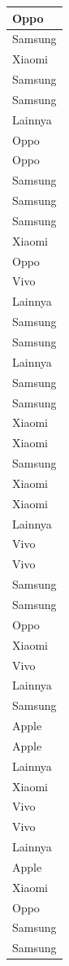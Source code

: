 \documentclass[
  letterpaper,
  DIV=11,
  numbers=noendperiod]{scrartcl}
\begin{document}
\begin{table}
\begin{tabular}[t]{l}
\hline
Oppo\\
\hline
Samsung\\
\hline
Xiaomi\\
\hline
Samsung\\
\hline
Samsung\\
\hline
Lainnya\\
\hline
Oppo\\
\hline
Oppo\\
\hline
Samsung\\
\hline
Samsung\\
\hline
Samsung\\
\hline
Xiaomi\\
\hline
Oppo\\
\hline
Vivo\\
\hline
Lainnya\\
\hline
Samsung\\
\hline
Samsung\\
\hline
Lainnya\\
\hline
Samsung\\
\hline
Samsung\\
\hline
Xiaomi\\
\hline
Xiaomi\\
\hline
Samsung\\
\hline
Xiaomi\\
\hline
Xiaomi\\
\hline
Lainnya\\
\hline
Vivo\\
\hline
Vivo\\
\hline
Samsung\\
\hline
Samsung\\
\hline
Oppo\\
\hline
Xiaomi\\
\hline
Vivo\\
\hline
Lainnya\\
\hline
Samsung\\
\hline
Apple\\
\hline
Apple\\
\hline
Lainnya\\
\hline
Xiaomi\\
\hline
Vivo\\
\hline
Vivo\\
\hline
Lainnya\\
\hline
Apple\\
\hline
Xiaomi\\
\hline
Oppo\\
\hline
Samsung\\
\hline
Samsung\\

\end{tabular}
\end{table}
\end{document}
